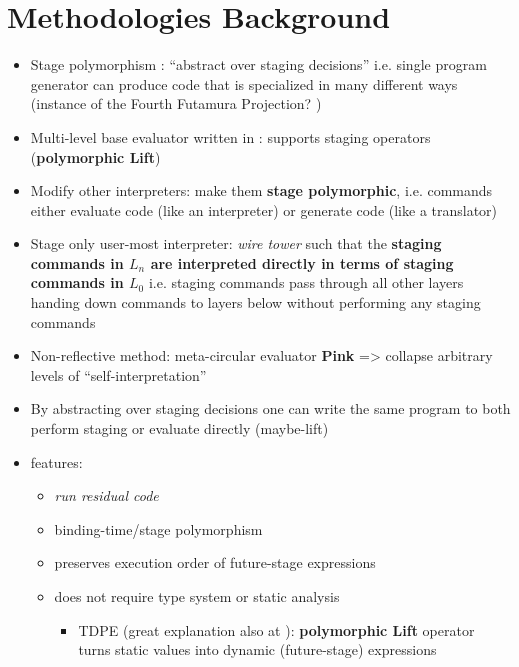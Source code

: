 \documentclass[fleqn]{article}
\theoremstyle{definition}
\begin{document}
\section{Methodologies Background}
\begin{itemize}
	\item Stage polymorphism \cite{ofenbeck2017staging}: ``abstract over staging decisions'' i.e. single program generator can produce code that is specialized in many different ways (instance of the Fourth Futamura Projection? \cite{gluck2009there}) 
	\item Multi-level base evaluator written in \mslang: supports staging operators (\textbf{polymorphic Lift})
	\item Modify other interpreters: make them \textbf{stage polymorphic}, i.e. commands either evaluate code (like an interpreter) or generate code (like a translator)
	\item Stage only user-most interpreter: \textit{wire tower} such that the \textbf{staging commands in $L_{n}$ are interpreted directly in terms of staging commands in $L_{0}$} i.e. staging commands pass through all other layers handing down commands to layers below without performing any staging commands
	\item Non-reflective method: meta-circular evaluator \textbf{Pink} => collapse arbitrary levels of ``self-interpretation''
	\item By abstracting over staging decisions one can write the same program to both perform staging or evaluate directly \cite{amin2017collapsing} (maybe-lift)
	\item \mslang features:
	\begin{itemize}
		\item \textit{run residual code}
		\item binding-time/stage polymorphism \cite{henglein1994polymorphic}
		\item preserves execution order of future-stage expressions
		\item does not require type system or static analysis
		\begin{itemize}
			\item TDPE \cite{danvy1999type} (great explanation also at \cite{grobauer2001second}): \textbf{polymorphic Lift} operator turns static values into dynamic (future-stage) expressions
		\end{itemize}
	\end{itemize}
\end{itemize}
\end{document}

